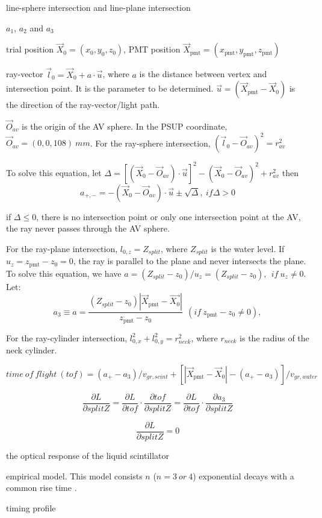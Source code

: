line-sphere intersection and line-plane intersection

$a_1$, $a_2$ and $a_3$


trial position $\vec{X}_0=(x_0,y_0,z_0)$,  PMT position $\vec{X}_{\mathrm{pmt}}=(x_\mathrm{pmt},y_\mathrm{pmt},z_\mathrm{pmt})$


ray-vector $\vec{l}_0=\vec{X}_0+a\cdot \vec{u}$,
where $a$ is the distance between vertex and intersection point. It is the parameter to be determined.
$\vec{u}=(\vec{X}_{\mathrm{pmt}}-\vec{X}_0)$ is the direction of the ray-vector/light path.

$\vec{O}_{av}$ is the origin of the AV sphere. In the PSUP coordinate, $\vec{O}_{av} = (0,0,108)~mm$.
For the ray-sphere intersection,
$(\vec{l}_0-\vec{O}_{av})^2 = r^2_{av}$

To solve this equation, let $\Delta = {[(\vec{X}_0-\vec{O}_{av})\cdot\vec{u}]}^2-{(\vec{X}_0-\vec{O}_{av})}^2+r^2_{av}$
then
\[
a_{+,-} = -(\vec{X}_0-\vec{O}_{av})\cdot\vec{u}\pm\sqrt{\Delta},
~if \Delta>0\]

if $\Delta\leq0$,
there is no intersection point or only one intersection point at the AV, the ray never passes through the AV sphere.

For the ray-plane intersection, 
$l_{0,z} = Z_{split}$, where $Z_{split}$ is the water level.
If $u_z=z_\mathrm{pmt}-z_0=0$, the ray is parallel to the plane and never intersects the plane.
To solve this equation, we have $a=(Z_{split}-z_0)/u_z=(Z_{split}-z_0),~~if~u_z\neq 0$.
Let: 
\[
a_3 \equiv a = \frac{(Z_{split}-z_0)|\vec{X}_{\mathrm{pmt}}-\vec{X_0}|}{z_\mathrm{pmt}-z_0}~~(if ~z_\mathrm{pmt}-z_0\neq 0),
\]


For the ray-cylinder intersection,
$l^2_{0,x}+l^2_{0,y} = r^2_{neck}$, where $ r_{neck}$ is the radius of the neck cylinder.

\[time~of~flight~(tof)=
(a_+-a_3)/v_{gr,scint}+[|\vec{X}_{\mathrm{pmt}}-\vec{X}_0|-(a_+-a_3)]/v_{gr,water}
\]


\[
\frac{\partial L}{\partial splitZ} = \frac{\partial L}{\partial tof}\cdot\frac{\partial tof}{\partial splitZ}=\frac{\partial L}{\partial tof}\cdot\frac{\partial a_3}{\partial splitZ}
\]


\[
\frac{\partial L}{\partial splitZ} = 0
\]

the optical response of the liquid scintillator

empirical model. This model consists $n$ ($n=3~or~4$) exponential decays  with a common rise time \cite{biller2020slow}.

timing profile 




